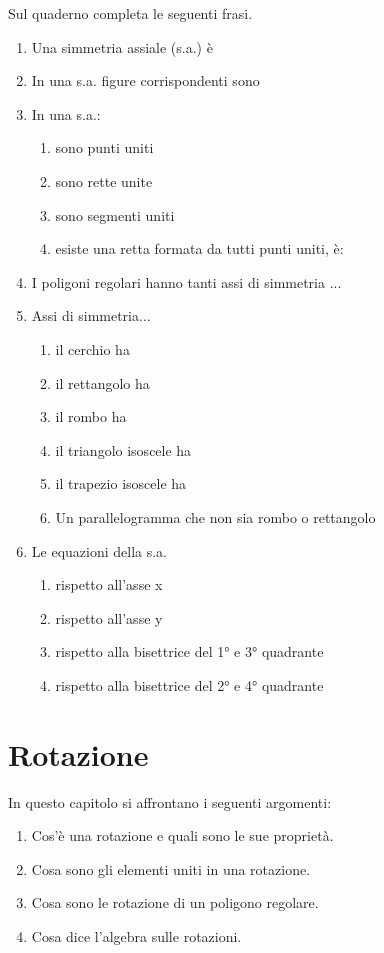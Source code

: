 Sul quaderno completa le seguenti frasi.
\begin{enumerate} [noitemsep]
\item Una simmetria assiale (s.a.) è
\item In una s.a. figure corrispondenti sono
\item In una s.a.:
\begin{enumerate} [noitemsep]
\item sono punti uniti
\item sono rette unite
\item sono segmenti uniti
\item esiste una retta formata da tutti punti uniti, è:
\end{enumerate}
\item I poligoni regolari hanno tanti assi di simmetria ...
\item Assi di simmetria...
\begin{enumerate} [noitemsep]
\item il cerchio ha
\item il rettangolo ha
\item il rombo ha
\item il triangolo isoscele ha
\item il trapezio isoscele ha
\item Un parallelogramma che non sia rombo o rettangolo
\end{enumerate}
\item Le equazioni della s.a.
\begin{enumerate} [noitemsep]
\item rispetto all'asse x
\item rispetto all'asse y
\item rispetto alla bisettrice del 1° e 3° quadrante
\item rispetto alla bisettrice del 2° e 4° quadrante
\end{enumerate}
\end{enumerate}


\section{Rotazione}
\label{sec:rotazione}

In questo capitolo si affrontano i seguenti argomenti:

\begin{enumerate} [noitemsep]
\item Cos'è una rotazione e quali sono le sue proprietà.
\item Cosa sono gli elementi uniti in una rotazione.
\item Cosa sono le rotazione di un poligono regolare.
\item Cosa dice l'algebra sulle rotazioni.

\end{enumerate}


